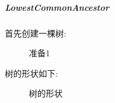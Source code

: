 \documentclass[supercite]{Experimental_Report}
\theoremstyle{definition}
\begin{document}
\clearpage
\subparagraph{LowestCommonAncestor}
\noindent
首先创建一棵树:
\begin{figure}[htbp]
	\centering
	\centering
	\caption{准备1}
	\label{fig5-80}
\end{figure}

\noindent
树的形状如下:
\begin{figure}[H]
	\centering
	\centering
	\caption{树的形状}
	\label{fig5-81}
\end{figure}
\end{document}
